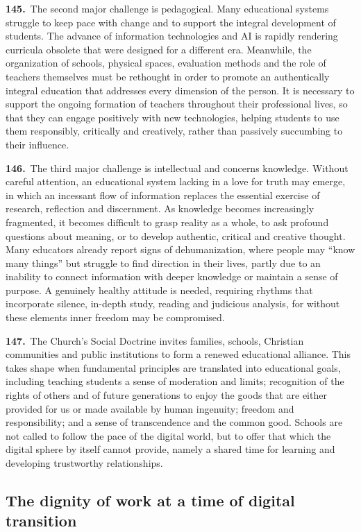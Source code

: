 \documentclass{article}
\begin{document}
\textbf{145.}\ The second major challenge is pedagogical. Many educational systems struggle to keep pace with change and to support the integral development of students. The advance of information technologies and AI is rapidly rendering curricula obsolete that were designed for a different era. Meanwhile, the organization of schools, physical spaces, evaluation methods and the role of teachers themselves must be rethought in order to promote an authentically integral education that addresses every dimension of the person. It is necessary to support the ongoing formation of teachers throughout their professional lives, so that they can engage positively with new technologies, helping students to use them responsibly, critically and creatively, rather than passively succumbing to their influence.

\textbf{146.}\ The third major challenge is intellectual and concerns knowledge. Without careful attention, an educational system lacking in a love for truth may emerge, in which an incessant flow of information replaces the essential exercise of research, reflection and discernment. As knowledge becomes increasingly fragmented, it becomes difficult to grasp reality as a whole, to ask profound questions about meaning, or to develop authentic, critical and creative thought. Many educators already report signs of dehumanization, where people may ``know many things'' but struggle to find direction in their lives, partly due to an inability to connect information with deeper knowledge or maintain a sense of purpose. A genuinely healthy attitude is needed, requiring rhythms that incorporate silence, in-depth study, reading and judicious analysis, for without these elements inner freedom may be compromised.

\textbf{147.}\ The Church's Social Doctrine invites families, schools, Christian communities and public institutions to form a renewed educational alliance. This takes shape when fundamental principles are translated into educational goals, including teaching students a sense of moderation and limits; recognition of the rights of others and of future generations to enjoy the goods that are either provided for us or made available by human ingenuity; freedom and responsibility; and a sense of transcendence and the common good. Schools are not called to follow the pace of the digital world, but to offer that which the digital sphere by itself cannot provide, namely a shared time for learning and developing trustworthy relationships.

\subsection{The dignity of work at a time of digital transition}
\end{document}
